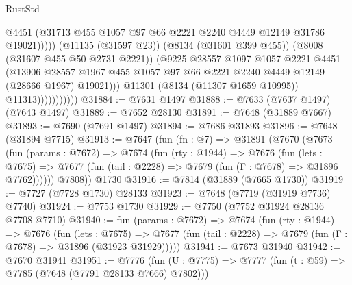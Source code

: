 \begin{lexlean}{RustStd}
\begin{coremodule}
{\begin{coremodule}
{{{{{{{{{{{{{{{{{{{{{{{{{{{{{{{{{{{{{{{{{{{{{{{{{{{{{                                    @4451
                                    (@31713
                                      @455
                                      @1057
                                      @97
                                      @66
                                      @2221
                                      @2240
                                      @4449
                                      @12149
                                      @31786
                                      @19021)))))
                            (@11135 (@31597 @23))
                            (@8134 (@31601 @399 @455))
                            (@8008 (@31607 @455 @50 @2731 @2221))
                            (@9225
                              @28557
                              @1097
                              @1057
                              @2221
                              @4451
                              (@13906
                                @28557
                                @1967
                                @455
                                @1057
                                @97
                                @66
                                @2221
                                @2240
                                @4449
                                @12149
                                (@28666 @1967)
                                @19021)))
                          @11301
                          (@8134 (@11307 @1659 @10995))
                          @11313)))))))))))
@31884 := @7631 @1497
@31888 := @7633 (@7637 @1497) (@7643 @1497)
@31889 := @7652 @28130
@31891 := @7648 (@31889 @7667)
@31893 := @7690 (@7691 @1497)
@31894 := @7686 @31893
@31896 := @7648 (@31894 @7715)
@31913 := @7647
    (fun (fn : @7) =>
    @31891
      (@7670
        (@7673
          (fun (params : @7672) =>
          @7674
            (fun (rty : @1944) =>
            @7676
              (fun (lets : @7675) =>
              @7677 (fun (tail : @2228) => @7679 (fun (Γ : @7678) => @31896 @7762))))))
        @7808))
    @1730
@31916 := @7814 (@31889 (@7665 @1730))
@31919 := @7727 (@7728 @1730) @28133
@31923 := @7648 (@7719 (@31919 @7736) @7740)
@31924 := @7753 @1730
@31929 := @7750 (@7752 @31924 @28136 @7708 @7710)
@31940 := fun (params : @7672) =>
  @7674
    (fun (rty : @1944) =>
    @7676
      (fun (lets : @7675) =>
      @7677 (fun (tail : @2228) => @7679 (fun (Γ : @7678) => @31896 (@31923 @31929)))))
@31941 := @7673 @31940
@31942 := @7670 @31941
@31951 := @7776
    (fun (U : @7775) => @7777 (fun (t : @59) => @7785 (@7648 (@7791 @28133 @7666) @7802)))
}}}}}}}}}}}}}}}}}}}}}}}}}}}}}}}}}}}}}}}}}}}}}}}}}}}}}
\end{coremodule}}
\end{coremodule}
\end{lexlean}
